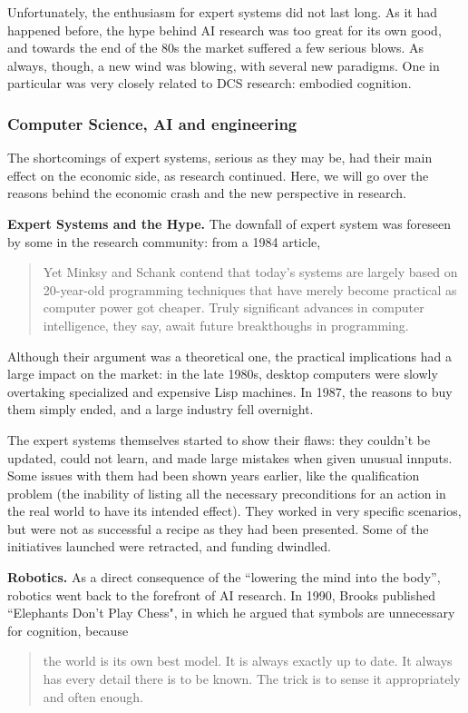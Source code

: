 \documentclass[../main.tex]{subfiles}
\begin{document}
Unfortunately, the enthusiasm for expert systems did not last long. As it had happened before, the hype behind AI research was too great for its own good, and towards the end of the 80s the market suffered a few serious blows. As always, though, a new wind was blowing, with several new paradigms. One in particular was very closely related to DCS research: embodied cognition.

\subsubsection{Computer Science, AI and engineering}
The shortcomings of expert systems, serious as they may be, had their main effect on the economic side, as research continued. Here, we will go over the reasons behind the economic crash and the new perspective in research.

\vspace{4pt}
\textbf{Expert Systems and the Hype.}
The downfall of expert system was foreseen by some in the research community: from a 1984 article\cite{universityWhyComputersCan1984},
\begin{quote}
    Yet Minksy and Schank contend that today's systems are largely based on 20-year-old programming techniques that have merely become practical as computer power got cheaper. Truly significant advances in computer intelligence, they say, await future breakthoughs in programming.
\end{quote}

Although their argument was a theoretical one, the practical implications had a large impact on the market: in the late 1980s, desktop computers were slowly overtaking specialized and expensive Lisp machines. In 1987, the reasons to buy them simply ended, and a large industry fell overnight.

The expert systems themselves started to show their flaws: they couldn't be updated, could not learn, and made large mistakes when given unusual innputs. Some issues with them had been shown years earlier, like the qualification problem (the inability of listing all the necessary preconditions for an action in the real world to have its intended effect). They worked in very specific scenarios, but were not as successful a recipe as they had been presented. Some of the initiatives launched were retracted, and funding dwindled\cite{mccorduckMachinesWhoThink2004}.

\vspace{4pt}
\textbf{Robotics.} As a direct consequence of the ``lowering the mind into the body'', robotics went back to the forefront of AI research. In 1990, Brooks published ``Elephants Don't Play Chess"\cite{brooksElephantsDonPlay1990}, in which he argued that symbols are unnecessary for cognition, because
\begin{quote}
    the world is its own best model. It is always exactly up to date. It always has every detail there is to be known. The trick is to sense it appropriately and often enough.
\end{quote}
\end{document}
